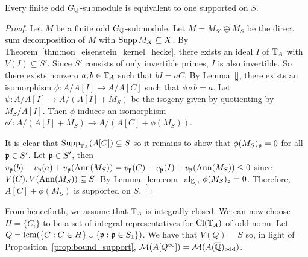 \documentclass[11pt, proquest]{uwthesis}
\begin{document}
\begin{proposition}%
    \label{prop:bound_support}
    Every finite odd $G_{\mathbb{Q}}$-submodule is equivalent to one supported on $S$.
\end{proposition}
\begin{proof}
    Let $M$ be a finite odd $G_{\mathbb{Q}}$-submodule. Let $M=M_{S'}\oplus M_S$ be the
    direct sum decomposition of $M$ with $\operatorname{Supp} M_X \subseteq X$. By
    Theorem~\ref{thm:non_eisenstein_kernel_hecke}, there exists an ideal
    $I$ of $\mathbb{T}_A$ with $V(I)\subseteq S'$. Since $S'$ consists of only
    invertible primes, $I$ is also invertible. So there exists nonzero $a,b\in
    \mathbb{T}_A$ such that $bI=aC$. By Lemma~\ref{}, there exists an isomorphism
    $\phi:A/A[I]\to A/A[C]$ such that $\phi\circ b = a$. Let $\psi:A/A[I]\to
    A/(A[I]+M_S)$ be the isogeny given by quotienting by $M_S/A[I]$. Then
    $\phi$ induces an isomorphism $\phi':A/(A[I]+M_S)\to A/(A[C]+\phi(M_S))$.

    It is clear that $\operatorname{Supp}_{\mathbb{T}_A}(A[C])\subseteq S$ so it remains to show
    that $\phi(M_S)_{\mathfrak{p}} =0$ for all $\mathfrak{p} \in S'$. Let $\mathfrak{p}\in S'$, then
    $v_{\mathfrak{p}}(b)-v_{\mathfrak{p}}(a)+v_{\mathfrak{p}}(\operatorname{Ann}(M_S))=v_{\mathfrak{p}}(C)-v_{\mathfrak{p}}(I)+v_{\mathfrak{p}}(\operatorname{Ann}(M_S)) \leq 0$
    since $V(C),V(\operatorname{Ann}(M_S))\subseteq S$. By Lemma~\ref{lem:com_alg},
    $\phi(M_S)_{\mathfrak{p}} = 0$. Therefore, $A[C]+\phi(M_S)$ is supported on $S$.
\end{proof}

From henceforth, we assume that $\mathbb{T}_A$ is integrally closed. We can now choose
$H=\{C_i\}$ to be a set of integral representatives for $\operatorname{Cl}(\mathbb{T}_A)$ of odd
norm. Let $Q=\operatorname{lcm}(\{C:C\in H\}\cup \{\mathfrak{p}:\mathfrak{p}\in S_1\})$. We have that $V(Q)=S$
so, in light of Proposition~\ref{prop:bound_support},
$\mathcal{M}(A[Q^\infty])=\mathcal{M}(A(\overline{\mathbb{Q}})_{\mathrm{odd}})$.
\end{document}
